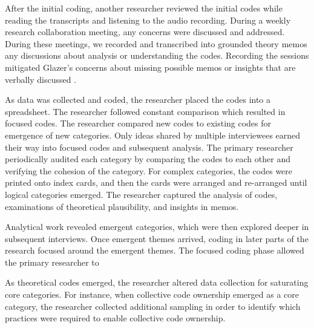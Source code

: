 After the initial coding, another researcher reviewed the initial codes while reading the transcripts and listening to the audio recording. During a weekly research collaboration meeting, any concerns were discussed and addressed. During these meetings, we recorded and transcribed into grounded theory memos any discussions about analysis or understanding the codes. Recording the sessions mitigated Glazer's concerns about missing possible memos or insights that are verbally discussed \cite{GlaserTheoreticalSensitivity}.

As data was collected and coded, the researcher placed the codes into a spreadsheet. The researcher followed constant comparison which resulted in focused codes.  The researcher compared new codes to existing codes for emergence of new categories. Only ideas shared by multiple interviewees earned their way into focused codes and subsequent analysis. The primary researcher periodically audited each category by comparing the codes to each other and verifying the cohesion of the category. For complex categories, the codes were printed onto index cards, and then the cards were arranged and re-arranged until logical categories emerged.  The researcher captured the analysis of codes, examinations of theoretical plausibility, and insights in memos. 

Analytical work revealed emergent categories, which were then explored deeper in subsequent interviews.  Once emergent themes arrived, coding in later parts of the research focused around the emergent themes. The focused coding phase allowed the primary researcher to 

As theoretical codes emerged, the researcher altered data collection for saturating core categories. For instance, when collective code ownership emerged as a core category, the researcher collected additional sampling in order to identify which practices were required to enable collective code ownership.

